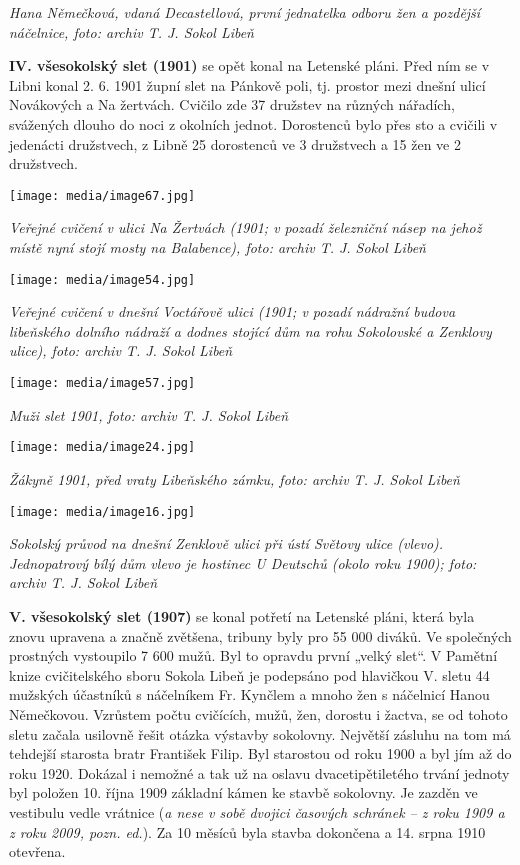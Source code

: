 \emph{Hana Němečková, vdaná Decastellová, první jednatelka odboru žen a
pozdější náčelnice, foto: archiv T. J. Sokol Libeň}

\textbf{IV. všesokolský slet (1901)} se opět konal na Letenské pláni.
Před ním se v Libni konal 2. 6. 1901 župní slet na Pánkově poli, tj.
prostor mezi dnešní ulicí Novákových a Na žertvách. Cvičilo zde 37
družstev na různých nářadích, svážených dlouho do noci z okolních
jednot. Dorostenců bylo přes sto a cvičili v jedenácti družstvech, z
Libně 25 dorostenců ve 3 družstvech a 15 žen ve 2 družstvech.

\texttt{[image: media/image67.jpg]}

\emph{Veřejné cvičení v ulici Na Žertvách (1901; v pozadí železniční
násep na jehož místě nyní stojí mosty na Balabence), foto: archiv T. J.
Sokol Libeň}

\texttt{[image: media/image54.jpg]}

\emph{Veřejné cvičení v dnešní Voctářově ulici (1901; v pozadí nádražní
budova libeňského dolního nádraží a dodnes stojící dům na rohu
Sokolovské a Zenklovy ulice), foto: archiv T. J. Sokol Libeň}

\texttt{[image: media/image57.jpg]}

\emph{Muži slet 1901, foto: archiv T. J. Sokol Libeň}

\texttt{[image: media/image24.jpg]}

\emph{Žákyně 1901, před vraty Libeňského zámku, foto: archiv T. J. Sokol
Libeň}

\texttt{[image: media/image16.jpg]}

\emph{Sokolský průvod na dnešní Zenklově ulici při ústí Světovy ulice
(vlevo). Jednopatrový bílý dům vlevo je hostinec U Deutschů (okolo roku
1900); foto: archiv T. J. Sokol Libeň}

\textbf{V. všesokolský slet (1907)} se konal potřetí na Letenské pláni,
která byla znovu upravena a značně zvětšena, tribuny byly pro 55 000
diváků. Ve společných prostných vystoupilo 7 600 mužů. Byl to opravdu
první „velký slet``. V Pamětní knize cvičitelského sboru Sokola Libeň je
podepsáno pod hlavičkou V. sletu 44 mužských účastníků s náčelníkem Fr.
Kynčlem a mnoho žen s náčelnicí Hanou Němečkovou. Vzrůstem počtu
cvičících, mužů, žen, dorostu i žactva, se od tohoto sletu začala
usilovně řešit otázka výstavby sokolovny. Největší zásluhu na tom má
tehdejší starosta bratr František Filip. Byl starostou od roku 1900 a
byl jím až do roku 1920. Dokázal i nemožné a tak už na oslavu
dvacetipětiletého trvání jednoty byl položen 10. října 1909 základní
kámen ke stavbě sokolovny. Je zazděn ve vestibulu vedle vrátnice
(\emph{a nese v sobě dvojici časových schránek -- z roku 1909 a z roku
2009, pozn. ed.}). Za 10 měsíců byla stavba dokončena a 14. srpna 1910
otevřena.

